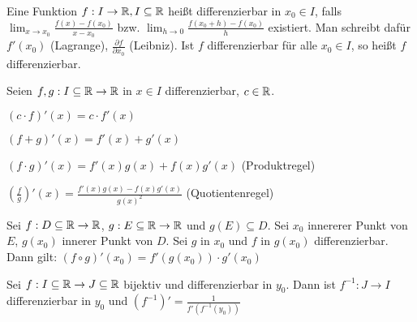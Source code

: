 \begin{definition}[Differenzierbarkeit]
	Eine Funktion $f : I \rightarrow \mathbb{R}, I \subseteq \mathbb{R}$ heißt differenzierbar in $x_0 \in I$, falls $\lim_{x \rightarrow x_0} \frac{f(x) - f(x_0)}{x - x_0}$ bzw. $\lim_{h \rightarrow 0} \frac{f(x_0 + h) - f(x_0)}{h}$ existiert. Man schreibt dafür $f'(x_0)$ (Lagrange), $\frac{\partial f}{\partial x_0}$ (Leibniz). Ist $f$ differenzierbar für alle $x_0 \in I$, so heißt $f$ differenzierbar.
\end{definition}

\begin{satz}
	Seien $f,g : I \subseteq \mathbb{R} \rightarrow \mathbb{R}$ in $x \in I$ differenzierbar, $c \in \mathbb{R}$.
	\begin{description}[noitemsep]
		\item $(c \cdot f)'(x) = c \cdot f'(x) $
		\item $(f + g)'(x) = f'(x) + g'(x) $
		\item $(f \cdot g)'(x) = f'(x) g(x) + f(x)g'(x) $  (Produktregel)
		\item $(\frac{f}{g})'(x) = \frac{f'(x) g(x) - f(x)g'(x)}{g(x)^2} $	 (Quotientenregel)
	\end{description}
\end{satz}

\begin{satz}[Kettenregel]
	Sei $f :  D \subseteq \mathbb{R} \rightarrow \mathbb{R}$, $g : E \subseteq \mathbb{R} \rightarrow \mathbb{R}$ und $g(E) \subseteq D$. Sei $x_0$ innererer Punkt von $E$, $g(x_0)$ innerer Punkt von $D$. Sei $g$ in $x_0$ und $f$ in $g(x_0)$ differenzierbar. Dann gilt: $(f \circ g)'(x_0) = f'(g(x_0)) \cdot g'(x_0)$
 \end{satz}

\begin{satz}
	Sei $f : I \subseteq \mathbb{R} \rightarrow J \subseteq \mathbb{R} $ bijektiv und differenzierbar in $y_0$. Dann ist $f^{-1} : J \rightarrow I$ differenzierbar in $y_0$ und $(f^{-1})'=\frac{1}{f'(f^{-1}(y_0))}$
\end{satz}



